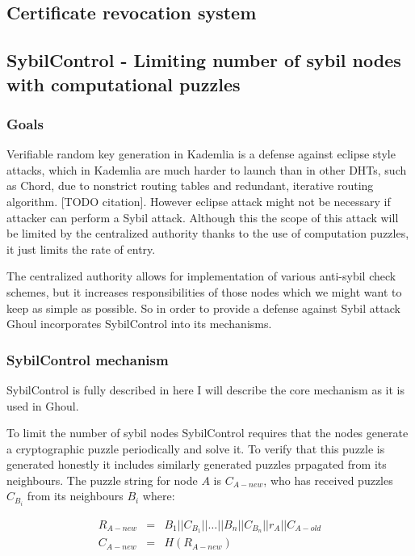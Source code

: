\subsection{Certificate revocation system}

\subsection{SybilControl - Limiting number of sybil nodes with computational
puzzles}
\subsubsection{Goals}
  Verifiable random key generation in Kademlia is a defense against eclipse
  style attacks, which in Kademlia are much harder to launch than in other
  DHTs, such as Chord, due to nonstrict routing tables and redundant, iterative
  routing algorithm. [TODO citation]. However eclipse attack might not be
  necessary if attacker can perform a Sybil attack. Although this the scope of
  this attack will be limited by the centralized authority thanks to the use of
  computation puzzles, it just limits the rate of entry.

  The centralized authority allows for implementation of various anti-sybil
  check schemes, but it increases responsibilities of those nodes which we might
  want to keep as simple as possible. So in order to provide a defense against
  Sybil attack Ghoul incorporates SybilControl into its mechanisms.

\subsubsection{SybilControl mechanism}
  SybilControl is fully described in \cite{li12} here I will describe the core
  mechanism as it is used in Ghoul. 

  To limit the number of sybil nodes SybilControl requires that the nodes
  generate a cryptographic puzzle periodically and solve it. To verify that this
  puzzle is generated honestly it includes similarly generated puzzles prpagated
  from its neighbours. The puzzle string for node $A$ is $C_{A-new}$, who has
  received puzzles $C_{B_i}$ from its neighbours $B_{i}$ where:

  \begin{eqnarray*}
      R_{A-new} &=& B_1||C_{B_1}||\ldots||B_n||C_{B_n}||r_A||C_{A-old}\\
    C_{A-new} &=& H\left(R_{A-new}\right)
  \end{eqnarray*}

